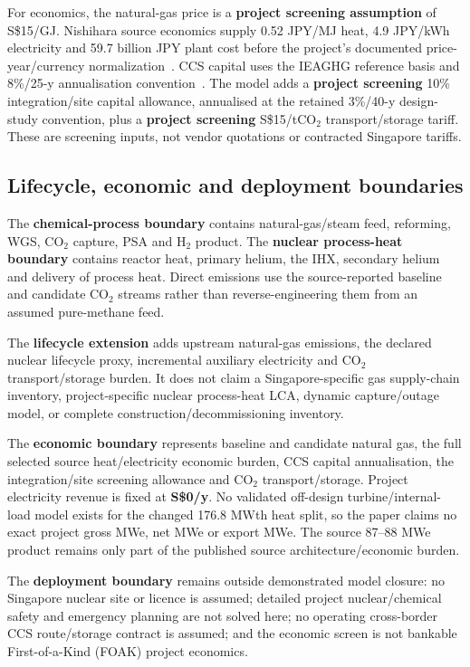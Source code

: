 For economics, the natural-gas price is a \textbf{project screening assumption} of S\$15/GJ. Nishihara source economics supply 0.52 JPY/MJ heat, 4.9 JPY/kWh electricity and 59.7 billion JPY plant cost before the project's documented price-year/currency normalization~\cite{nishihara2007potential}. CCS capital uses the IEAGHG reference basis and 8\%/25-y annualisation convention~\cite{ieaghg2017smr}. The model adds a \textbf{project screening} 10\% integration/site capital allowance, annualised at the retained 3\%/40-y design-study convention, plus a \textbf{project screening} S\$15/tCO$_2$ transport/storage tariff. These are screening inputs, not vendor quotations or contracted Singapore tariffs.

\subsection{Lifecycle, economic and deployment boundaries}
The \textbf{chemical-process boundary} contains natural-gas/steam feed, reforming, WGS, CO$_2$ capture, PSA and H$_2$ product. The \textbf{nuclear process-heat boundary} contains reactor heat, primary helium, the IHX, secondary helium and delivery of process heat. Direct emissions use the source-reported baseline and candidate CO$_2$ streams rather than reverse-engineering them from an assumed pure-methane feed.

The \textbf{lifecycle extension} adds upstream natural-gas emissions, the declared nuclear lifecycle proxy, incremental auxiliary electricity and CO$_2$ transport/storage burden. It does not claim a Singapore-specific gas supply-chain inventory, project-specific nuclear process-heat LCA, dynamic capture/outage model, or complete construction/decommissioning inventory.

The \textbf{economic boundary} represents baseline and candidate natural gas, the full selected source heat/electricity economic burden, CCS capital annualisation, the integration/site screening allowance and CO$_2$ transport/storage. Project electricity revenue is fixed at \textbf{S\$0/y}. No validated off-design turbine/internal-load model exists for the changed 176.8 MWth heat split, so the paper claims no exact project gross MWe, net MWe or export MWe. The source 87--88 MWe product remains only part of the published source architecture/economic burden.

The \textbf{deployment boundary} remains outside demonstrated model closure: no Singapore nuclear site or licence is assumed; detailed project nuclear/chemical safety and emergency planning are not solved here; no operating cross-border CCS route/storage contract is assumed; and the economic screen is not bankable First-of-a-Kind (FOAK) project economics.

